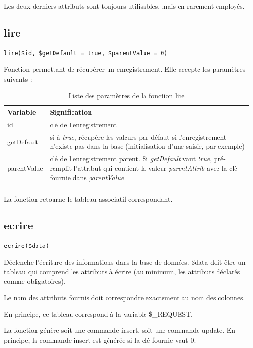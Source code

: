 Les deux derniers attributs sont toujours utilisables, mais en rarement employés.

\subsection{lire}
\begin{lstlisting}
lire($id, $getDefault = true, $parentValue = 0)
\end{lstlisting}

Fonction permettant de récupérer un enregistrement. Elle accepte les paramètres suivants :
\begin{longtable}{|p{3cm}|p{10cm}|}
\hline
\textbf{Variable} & \textbf{Signification} \\
\hline
\endhead
\hline\endfoot\endlastfoot
id & clé de l'enregistrement \\

getDefault & si à \textit{true}, récupère les valeurs par défaut si l'enregistrement n'existe pas dans la base (initialisation d'une saisie, par exemple)\\

parentValue & clé de l'enregistrement parent. Si \textit{getDefault} vaut \textit{true}, pré-remplit l'attribut qui contient la valeur \textit{parentAttrib} avec la clé fournie dans \textit{parentValue} \\
\hline

\caption{Liste des paramètres de la fonction lire}
\end{longtable}

La fonction retourne le tableau associatif correspondant.

\subsection{ecrire}
\begin{lstlisting}
ecrire($data)
\end{lstlisting}
Déclenche l'écriture des informations dans la base de données. \$data doit être un tableau qui comprend les attributs à écrire (au minimum, les attributs déclarés comme obligatoires).

Le nom des attributs fournis doit correspondre exactement au nom des colonnes.

En principe, ce tableau correspond à la variable \$\_REQUEST.

La fonction génère soit une commande insert, soit une commande update. En principe, la commande insert est générée si la clé fournie vaut 0.


